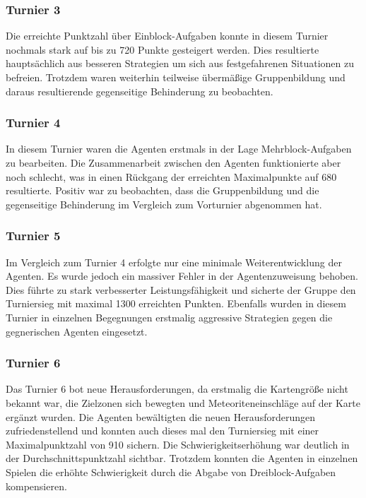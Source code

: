 \documentclass[runningheads]{llncs}
\begin{document}
\subsubsection{Turnier 3}

Die erreichte Punktzahl über Einblock-Aufgaben konnte in diesem Turnier nochmals stark auf bis zu 720 Punkte gesteigert werden. Dies resultierte hauptsächlich aus besseren Strategien um sich aus festgefahrenen Situationen zu befreien. Trotzdem waren weiterhin teilweise übermäßige Gruppenbildung und daraus resultierende gegenseitige Behinderung zu beobachten.
\subsubsection{Turnier 4}

In diesem Turnier waren die Agenten erstmals in der Lage Mehrblock-Aufgaben zu bearbeiten. Die Zusammenarbeit zwischen den Agenten funktionierte aber noch schlecht, was in einen Rückgang der erreichten Maximalpunkte auf 680 resultierte. Positiv war zu beobachten, dass die Gruppenbildung und die gegenseitige Behinderung im Vergleich zum Vorturnier abgenommen hat.
\subsubsection{Turnier 5}

Im Vergleich zum Turnier 4 erfolgte nur eine minimale Weiterentwicklung der Agenten. Es wurde jedoch ein massiver Fehler in der Agentenzuweisung behoben. Dies führte zu stark verbesserter Leistungsfähigkeit und sicherte der Gruppe den Turniersieg mit maximal 1300 erreichten Punkten. Ebenfalls wurden in diesem Turnier in einzelnen Begegnungen erstmalig aggressive Strategien gegen die gegnerischen Agenten eingesetzt.

\subsubsection{Turnier 6}
Das Turnier 6 bot neue Herausforderungen, da erstmalig die Kartengröße nicht bekannt war, die Zielzonen sich bewegten und Meteoriteneinschläge auf der Karte ergänzt wurden. Die Agenten bewältigten die neuen Herausforderungen zufriedenstellend und konnten auch dieses mal den Turniersieg mit einer Maximalpunktzahl von 910 sichern. Die Schwierigkeitserhöhung war deutlich in der Durchschnittspunktzahl sichtbar. Trotzdem konnten die Agenten in einzelnen Spielen die erhöhte Schwierigkeit durch die Abgabe von Dreiblock-Aufgaben kompensieren.
\end{document}
